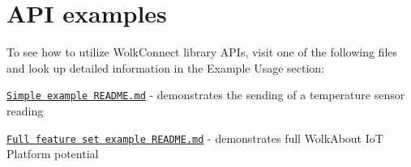  \section*{A\+PI examples}



 To see how to utilize Wolk\+Connect library A\+P\+Is, visit one of the following files and look up detailed information in the Example Usage section\+:


\begin{DoxyItemize}
\item \href{md_README.html}{\tt Simple example R\+E\+A\+D\+M\+E.\+md} -\/ demonstrates the sending of a temperature sensor reading
\item \href{md_examples_full_feature_set_README.html}{\tt Full feature set example R\+E\+A\+D\+M\+E.\+md} -\/ demonstrates full Wolk\+About IoT Platform potential 
\end{DoxyItemize}